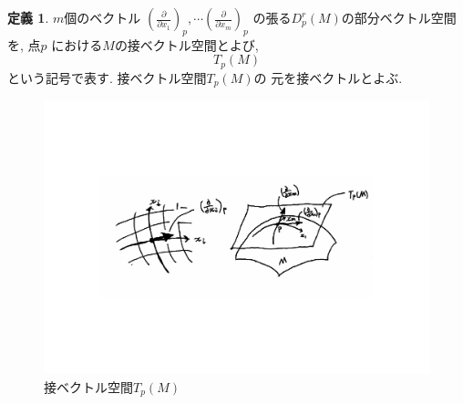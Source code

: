 \documentclass[a4j,12pt]{jarticle}
\theoremstyle{definition}
\newtheorem{definition}[theorem]{定義}
\begin{document}
    \begin{definition}\label{def:tangent vector space}
        $m$個のベクトル
        $\left(\frac{\partial}{\partial x_1}\right)_p, 
        \cdots 
        \left(\frac{\partial}{\partial x_m}\right)_p$
        の張る$D_p^r(M)$の部分ベクトル空間を, 点$p$
        における$M$の接ベクトル空間とよび, 
        $$T_p(M)$$
        という記号で表す. 接ベクトル空間$T_p(M)$の
        元を接ベクトルとよぶ. 
    \end{definition}
    \begin{figure}[H]
        \centering
        \includegraphics[keepaspectratio, scale=0.6]{tangentVectorSpace.pdf}
        \caption{接ベクトル空間$T_p(M)$}
        \label{tangentVectorSpace}
       \end{figure}
       
\end{document}
